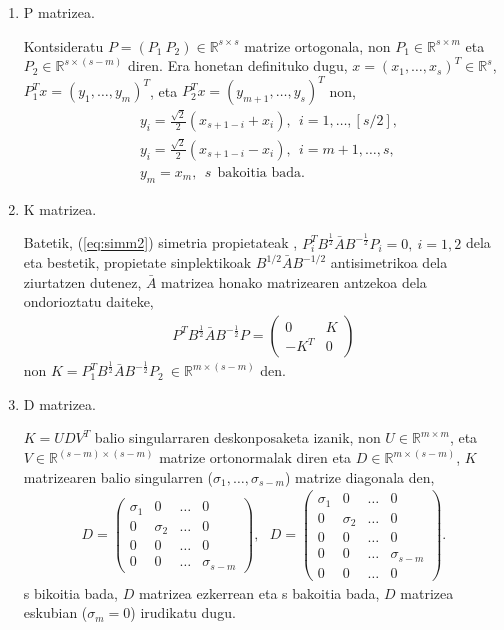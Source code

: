\begin{enumerate}
\item P matrizea.

Kontsideratu $P=(P_1 \ P_2) \in \mathbb{R}^{s \times s}$ matrize ortogonala, non $P_1 \in \mathbb{R}^{s \times m}$ eta $P_2 \in \mathbb{R}^{s \times (s-m)}$ diren. Era honetan definituko dugu,  $x=(x_1,\dots,x_s)^T \in \mathbb{R}^s$, $P_1^Tx=(y_1,\dots,y_m)^T$, eta $P_2^Tx=(y_{m+1},\dots,y_s)^T$ non,
\begin{align*}
&y_i = \frac{\sqrt{2}}{2} (x_{s+1-i}+x_i), \ \ i=1,\dots,[s/2], \\
&y_i =\frac{\sqrt{2}}{2} (x_{s+1-i}-x_{i}), \ \ i=m+1,\dots,s, \\
&y_{m} = x_{m}, \ \ s \ \ \mbox{bakoitia bada}.
\end{align*}  

\item K matrizea.

Batetik, (\ref{eq:simm2}) simetria propietateak ,  $P_i^TB^{\frac{1}{2}}\bar{A}B^{-\frac{1}{2}}P_i=0, \ i=1,2$ dela eta bestetik, propietate sinplektikoak $B^{1/2}\bar{A}B^{-1/2}$ antisimetrikoa dela ziurtatzen dutenez, $\bar{A}$ matrizea honako matrizearen antzekoa dela ondorioztatu daiteke,
\begin{align}
P^TB^{\frac{1}{2}}\bar{A}B^{-\frac{1}{2}}P=
\left(
\begin{matrix}
0 & K \\
-K^T & 0
\end{matrix}
\right)
\end{align}
non $K=P_1^TB^{\frac{1}{2}}\bar{A}B^{-\frac{1}{2}}P_2 \ \in \mathbb{R}^{m \times (s-m)}$ den.

\item D matrizea.

$K=UDV^T$ balio singularraren deskonposaketa izanik, non $U \in \mathbb{R}^{m \times m}$, eta $V \in \mathbb{R}^{(s-m) \times (s-m)}$ matrize ortonormalak diren eta $D \in \mathbb{R}^{m \times (s-m)}$, $K$ matrizearen balio singularren ($\sigma_1, \dots, \sigma_{s-m}$) matrize diagonala den,
\begin{align}
\label{eq:Dmat}
D=
\left(
\begin{matrix}
\sigma_1 & 0 & \dots & 0 \\
0 & \sigma_2 & \dots & 0 \\
0 & 0 & \dots & 0 \\
0 & 0 & \dots & \sigma_{s-m}
\end{matrix}
\right), \ \ \
D=
\left(
\begin{matrix}
\sigma_1 & 0 & \dots & 0 \\
0 & \sigma_2 & \dots & 0 \\
0 & 0 & \dots & 0 \\
0 & 0 & \dots & \sigma_{s-m} \\
0 & 0 & \dots & 0
\end{matrix}
\right).
\end{align}
s bikoitia bada, $D$ matrizea ezkerrean eta s bakoitia bada, $D$ matrizea eskubian ($\sigma_m=0$) irudikatu dugu. 


\end{enumerate}
